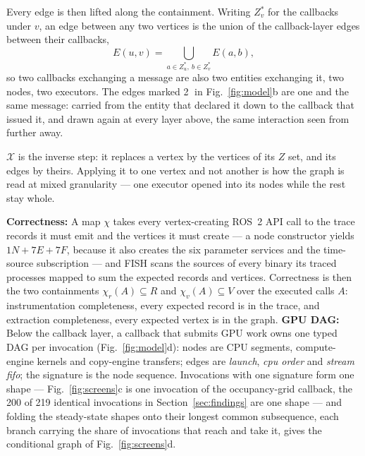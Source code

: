 \noindent
Every edge is then lifted along the containment. Writing $Z^{*}_{v}$ for the
callbacks under $v$, an edge between any two vertices is the union of the
callback-layer edges between their callbacks,
%
\[
  E(u,v)=\bigcup_{a\in Z^{*}_{u},\ b\in Z^{*}_{v}} E(a,b),
\]
%
so two callbacks exchanging a message are also two entities exchanging it, two
nodes, two executors. The edges marked \textcircled{\scriptsize 2} in
Fig.~\ref{fig:model}b are one and the same message: carried from the entity that
declared it down to the callback that issued it, and drawn again at every layer
above, the same interaction seen from further away.

\noindent
$\mathcal{X}$ is the inverse step: it replaces a vertex by the vertices of its
$Z$ set, and its edges by theirs. Applying it to one vertex and not another is
how the graph is read at mixed granularity --- one executor opened into its
nodes while the rest stay whole.

\noindent
\textbf{Correctness:}
A map $\chi$ takes every vertex-creating ROS~2 API call to the trace records it
must emit and the vertices it must create --- a node constructor yields
$1N+7E+7F$, because it also creates the six parameter services and the
time-source subscription --- and FISH scans the sources of every binary its
traced processes mapped to sum the expected records and vertices. Correctness is
then the two containments $\chi_r(A)\subseteq R$ and $\chi_v(A)\subseteq V$ over
the executed calls $A$: instrumentation completeness, every expected record is
in the trace, and extraction completeness, every expected vertex is in the
graph.\noindent
\textbf{GPU DAG:}
Below the callback layer, a callback that submits GPU work owns one typed DAG
per invocation (Fig.~\ref{fig:model}d): nodes are CPU segments, compute-engine
kernels and copy-engine transfers; edges are \emph{launch}, \emph{cpu order}
and \emph{stream fifo}; the signature is the node sequence. Invocations with
one signature form one shape --- Fig.~\ref{fig:screens}c is one invocation of
the occupancy-grid callback, the 200 of 219 identical invocations in
Section~\ref{sec:findings} are one shape --- and folding the steady-state
shapes onto their longest common subsequence, each branch carrying the share of
invocations that reach and take it, gives the conditional graph of
Fig.~\ref{fig:screens}d.


